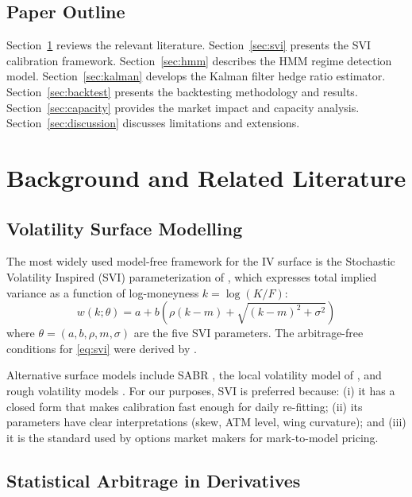\documentclass[12pt, letterpaper]{article}
\begin{document}
\subsection{Paper Outline}

Section~\ref{sec:background} reviews the relevant literature. Section~\ref{sec:svi}
presents the SVI calibration framework. Section~\ref{sec:hmm} describes the HMM
regime detection model. Section~\ref{sec:kalman} develops the Kalman filter hedge
ratio estimator. Section~\ref{sec:backtest} presents the backtesting methodology
and results. Section~\ref{sec:capacity} provides the market impact and capacity
analysis. Section~\ref{sec:discussion} discusses limitations and extensions.

\section{Background and Related Literature}
\label{sec:background}

\subsection{Volatility Surface Modelling}

The most widely used model-free framework for the IV surface is the
Stochastic Volatility Inspired (SVI) parameterization of
\citet{gatheral2004parsimonious}, which expresses total implied variance
as a function of log-moneyness $k = \log(K/F)$:
\begin{equation}
  w(k; \theta) = a + b\left(\rho(k-m) + \sqrt{(k-m)^2 + \sigma^2}\right)
  \label{eq:svi}
\end{equation}
where $\theta = (a, b, \rho, m, \sigma)$ are the five SVI parameters.
The arbitrage-free conditions for \eqref{eq:svi} were derived by
\citet{gatheral2014arbitrage}.

Alternative surface models include SABR \citep{hagan2002managing},
the local volatility model of \citet{dupire1994pricing}, and
rough volatility models \citep{gatheral2018volatility}. For our purposes,
SVI is preferred because: (i) it has a closed form that makes calibration
fast enough for daily re-fitting; (ii) its parameters have clear interpretations
(skew, ATM level, wing curvature); and (iii) it is the standard used by options
market makers for mark-to-model pricing.

\subsection{Statistical Arbitrage in Derivatives}
\end{document}
